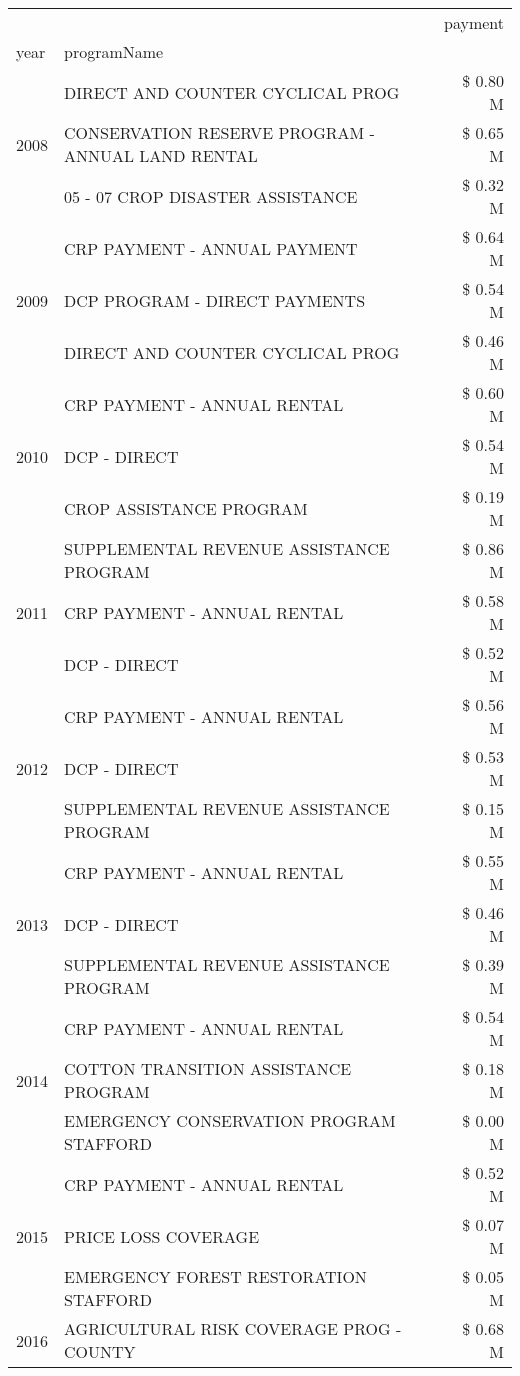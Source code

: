 \begin{tabular}{llr}
\toprule
 &  & payment \\
year & programName &  \\
\midrule
\multirow[t]{3}{*}{2008} & DIRECT AND COUNTER CYCLICAL PROG & \$ 0.80 M \\
 & CONSERVATION RESERVE PROGRAM - ANNUAL LAND RENTAL & \$ 0.65 M \\
 & 05 - 07 CROP DISASTER ASSISTANCE & \$ 0.32 M \\
\cline{1-3}
\multirow[t]{3}{*}{2009} & CRP PAYMENT - ANNUAL PAYMENT & \$ 0.64 M \\
 & DCP PROGRAM - DIRECT PAYMENTS & \$ 0.54 M \\
 & DIRECT AND COUNTER CYCLICAL PROG & \$ 0.46 M \\
\cline{1-3}
\multirow[t]{3}{*}{2010} & CRP PAYMENT - ANNUAL RENTAL & \$ 0.60 M \\
 & DCP - DIRECT & \$ 0.54 M \\
 & CROP ASSISTANCE PROGRAM & \$ 0.19 M \\
\cline{1-3}
\multirow[t]{3}{*}{2011} & SUPPLEMENTAL REVENUE ASSISTANCE PROGRAM & \$ 0.86 M \\
 & CRP PAYMENT - ANNUAL RENTAL & \$ 0.58 M \\
 & DCP - DIRECT & \$ 0.52 M \\
\cline{1-3}
\multirow[t]{3}{*}{2012} & CRP PAYMENT - ANNUAL RENTAL & \$ 0.56 M \\
 & DCP - DIRECT & \$ 0.53 M \\
 & SUPPLEMENTAL REVENUE ASSISTANCE PROGRAM & \$ 0.15 M \\
\cline{1-3}
\multirow[t]{3}{*}{2013} & CRP PAYMENT - ANNUAL RENTAL & \$ 0.55 M \\
 & DCP - DIRECT & \$ 0.46 M \\
 & SUPPLEMENTAL REVENUE ASSISTANCE PROGRAM & \$ 0.39 M \\
\cline{1-3}
\multirow[t]{3}{*}{2014} & CRP PAYMENT - ANNUAL RENTAL & \$ 0.54 M \\
 & COTTON TRANSITION ASSISTANCE PROGRAM & \$ 0.18 M \\
 & EMERGENCY CONSERVATION PROGRAM STAFFORD & \$ 0.00 M \\
\cline{1-3}
\multirow[t]{3}{*}{2015} & CRP PAYMENT - ANNUAL RENTAL & \$ 0.52 M \\
 & PRICE LOSS COVERAGE & \$ 0.07 M \\
 & EMERGENCY FOREST RESTORATION STAFFORD & \$ 0.05 M \\
\cline{1-3}
\multirow[t]{3}{*}{2016} & AGRICULTURAL RISK COVERAGE PROG - COUNTY & \$ 0.68 M \\

\end{tabular}
